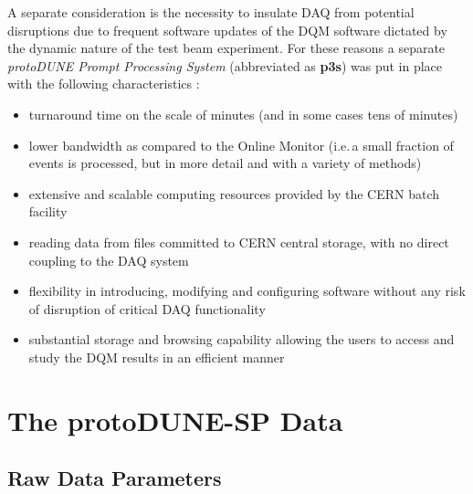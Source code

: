 \documentclass{webofc}
\newcommand{\pd}{protoDUNE\xspace}
\begin{document}
A separate consideration is the necessity to insulate DAQ from
potential disruptions due to frequent software updates of the DQM software dictated by
the dynamic nature of the test beam experiment. 
For these reasons a separate \textit{\pd Prompt Processing System} (abbreviated as \textbf{p3s}) was put
in place  with the following characteristics \cite{eps}:
\begin{itemize} 

\item turnaround time on the scale of minutes (and in some cases tens of minutes)

\item lower bandwidth as compared to the Online Monitor (i.e.\,a small fraction of events is processed,
but in more detail and with a variety of methods)

\item extensive and scalable computing resources provided by the CERN batch facility

\item reading data from files committed to CERN central storage, with no direct coupling to the DAQ system

\item flexibility in introducing, modifying and configuring software without any risk of disruption of
critical DAQ functionality

\item substantial storage and browsing capability allowing the users to access and study
the DQM results in an efficient manner

\end{itemize}


\section{The protoDUNE-SP Data}
\subsection{Raw Data Parameters}
\label{sec:np04_data_rate}
\end{document}
